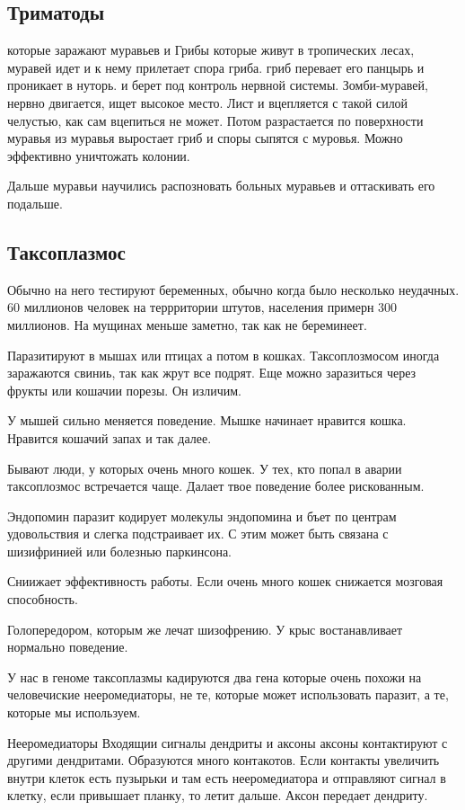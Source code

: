 \subsection{Триматоды}
 которые заражают муравьев и 
Грибы которые живут в тропических лесах,
муравей идет и к нему прилетает спора гриба. 
гриб перевает его панцырь и проникает в нуторь. 
и берет под контроль нервной системы. Зомби-муравей, 
нервно двигается, ищет высокое место. Лист и вцепляется с
такой силой челустью, как сам вцепиться не может. Потом
разрастается по поверхности муравья из муравья выростает гриб 
и споры сыпятся с муровья. Можно эффективно уничтожать колонии. 

Дальше муравьи научились распозновать больных муравьев и оттаскивать его подальше. 

\subsection{Таксоплазмос}
Обычно на него тестируют беременных, обычно 
когда было несколько неудачных. 
60 миллионов человек на террритории штутов, населения примерн 300 миллионов. 
На мущинах меньше заметно, так как не береминеет. 

Паразитируют в мышах или птицах а потом в кошках. 
Таксоплозмосом иногда заражаются свиниь, так 
как жрут все подрят. Еще можно заразиться 
через фрукты или кошачии порезы. Он изличим. 

У мышей сильно меняется поведение. Мышке начинает 
нравится кошка. Нравится кошачий запах и так далее. 

Бывают люди, у которых очень много кошек. У тех, 
кто попал в аварии таксоплозмос встречается чаще.
Далает твое поведение более рискованным. 

Эндопомин паразит кодирует молекулы эндопомина и бъет 
по центрам удовольствия и слегка подстраивает их. 
С этим может быть связана с шизифринией или болезнью 
паркинсона. 
 
Сниижает эффективность работы. Если
очень много кошек снижается мозговая способность.

Голопередором, которым же лечат шизофрению. У
крыс востанавливает нормально поведение.

У нас в геноме таксоплазмы кадируются два гена
которые очень похожи
на человечиские нееромедиаторы, не те,
которые может использовать паразит,
а те, которые мы используем.

Нееромедиаторы 
Входящии сигналы
дендриты и аксоны
аксоны контактируют с другими дендритами.
Образуются много контакотов. Если
контакты увеличить внутри клеток есть
пузырьки и там есть нееромедиатора и
отправляют сигнал в клетку, если привышает планку,
то летит дальше. Аксон передает дендриту.

